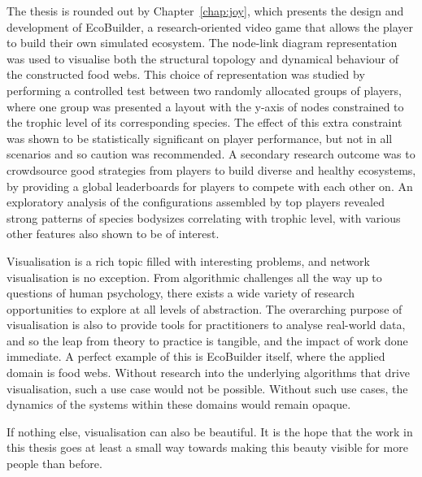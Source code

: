 The thesis is rounded out by Chapter~\ref{chap:joy}, which presents the design and development of EcoBuilder, a research-oriented video game that allows the player to build their own simulated ecosystem.
The node-link diagram representation was used to visualise both the structural topology and dynamical behaviour of the constructed food webs. This choice of representation was studied by performing a controlled test between two randomly allocated groups of players, where one group was presented a layout with the y-axis of nodes constrained to the trophic level of its corresponding species. The effect of this extra constraint was shown to be statistically significant on player performance, but not in all scenarios and so caution was recommended.
A secondary research outcome was to crowdsource good strategies from players to build diverse and healthy ecosystems, by providing a global leaderboards for players to compete with each other on. An exploratory analysis of the configurations assembled by top players revealed strong patterns of species bodysizes correlating with trophic level, with various other features also shown to be of interest.

Visualisation is a rich topic filled with interesting problems, and network visualisation is no exception. From algorithmic challenges all the way up to questions of human psychology, there exists a wide variety of research opportunities to explore at all levels of abstraction.
The overarching purpose of visualisation is also to provide tools for practitioners to analyse real-world data, and so the leap from theory to practice is tangible, and the impact of work done immediate.
A perfect example of this is EcoBuilder itself, where the applied domain is food webs. Without research into the underlying algorithms that drive visualisation, such a use case would not be possible. Without such use cases, the dynamics of the systems within these domains would remain opaque.

If nothing else, visualisation can also be beautiful.
It is the hope that the work in this thesis goes at least a small way towards making this beauty visible for more people than before.

